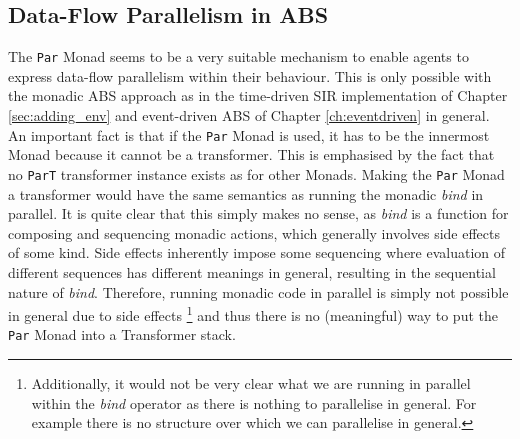 \subsection{Data-Flow Parallelism in ABS}
The \texttt{Par} Monad seems to be a very suitable mechanism to enable agents to express data-flow parallelism within their behaviour. This is only possible with the monadic ABS approach as in the time-driven SIR implementation of Chapter \ref{sec:adding_env} and event-driven ABS of Chapter \ref{ch:eventdriven} in general. An important fact is that if the \texttt{Par} Monad is used, it has to be the innermost Monad because it cannot be a transformer. This is emphasised by the fact that no \texttt{ParT} transformer instance exists as for other Monads. Making the \texttt{Par} Monad a transformer would have the same semantics as running the monadic \textit{bind} in parallel. It is quite clear that this simply makes no sense, as \textit{bind} is a function for composing and sequencing monadic actions, which generally involves side effects of some kind. Side effects inherently impose some sequencing where evaluation of different sequences has different meanings in general, resulting in the sequential nature of \textit{bind}. Therefore, running monadic code in parallel is simply not possible in general due to side effects \footnote{Additionally, it would not be very clear what we are running in parallel within the \textit{bind} operator as there is nothing to parallelise in general. For example there is no structure over which we can parallelise in general.} and thus there is no (meaningful) way to put the \texttt{Par} Monad into a Transformer stack.
